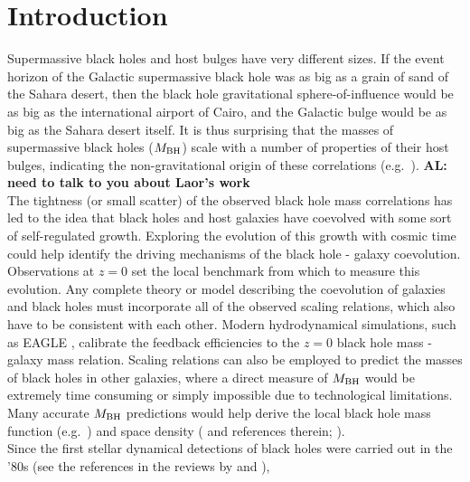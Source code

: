 \documentclass[preprint2]{emulateapj}
\begin{document}
\section{Introduction}
\label{sec:int}
Supermassive black holes and host bulges have very different sizes. 
If the event horizon of the Galactic supermassive black hole was as big as a grain of sand of the Sahara desert, 
then the black hole gravitational sphere-of-influence would be as big as the international airport of Cairo, 
and the Galactic bulge would be as big as the Sahara desert itself.
It is thus surprising that the masses of supermassive black holes ($M_{\rm BH}$) 
scale with a number of properties of their host bulges, 
indicating the non-gravitational origin of these correlations 
(e.g.~\citealt{dressler1989,yee1992,kormendyrichstone1995,magorrian1998,ferraresemerritt2000,gebhardt2000,graham2001,
marconihunt2003,haringrix2004,graham2012bent}). {\bf AL: need to talk to you about Laor's work}\\
The tightness (or small scatter) of the observed black hole mass correlations has led to the idea
that black holes and host galaxies have coevolved with some sort of self-regulated growth.
Exploring the evolution of this growth with cosmic time could help identify
the driving mechanisms of the black hole - galaxy coevolution.
Observations at $z=0$ set the local benchmark from which to measure this evolution.
Any complete theory or model describing the coevolution of galaxies and black holes must incorporate 
all of the observed scaling relations, which also have to be consistent with each other.
Modern hydrodynamical simulations, such as EAGLE \citep{schaye2015}, calibrate the feedback efficiencies 
to the $z=0$ black hole mass - galaxy mass relation.
Scaling relations can also be employed to predict the masses of black holes in other galaxies, where a direct
measure of $M_{\rm BH}$ would be extremely time consuming or simply impossible due to technological limitations.
Many accurate $M_{\rm BH}$ predictions would help derive 
the local black hole mass function (e.g.~\citealt{salucci1999,graham2007smbhmassfunction}) 
and space density (\citealt{grahamdriver2007smbhmassdensity} and references therein; \citealt{comastri2015}). \\
Since the first stellar dynamical detections of black holes were carried out in the '80s 
(see the references in the reviews by \citealt{kormendyrichstone1995} and \citealt{richstone1998}), 
\end{document}
